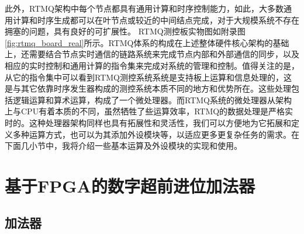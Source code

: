 此外，RTMQ架构中每个节点都具有通用计算和时序控制能力，如此，大多数通用计算和时序生成都可以在叶节点或较近的中间结点完成，对于大规模系统不存在拥塞的问题，具有良好的可扩展性。
RTMQ测控板实物图如附录图\ref{fig:rtmq_board_real}所示。RTMQ体系的构成在上述整体硬件核心架构的基础上，还需要结合节点实时通信的链路系统\cite[]{junhua02}来完成节点内部和外部通信的同步，以及相应的实时控制和通用计算的指令集\cite[]{junhua03}来完成对系统的管理和控制。值得关注的是，从它的指令集中可以看到RTMQ测控系统系统是支持板上运算和信息处理的，这是与其它依靠时序发生器构成的测控系统本质不同的地方和优势所在。这些处理包括逻辑运算和算术运算，构成了一个微处理器。而RTMQ系统的微处理器从架构上与CPU有着本质的不同，虽然牺牲了些运算效率，RTMQ的数据处理是严格实时的。这种处理器架构同样也具有拓展性和灵活性，我们可以方便地为它拓展和定义多种运算方式，也可以为其添加外设模块等，以适应更多更复杂任务的需求。在下面几小节中，我将介绍一些基本运算及外设模块的实现和使用。






\section[基于FPGA的数字超前进位加法器]{基于FPGA的数字超前进位加法器}

\subsection[加法器]{加法器}


